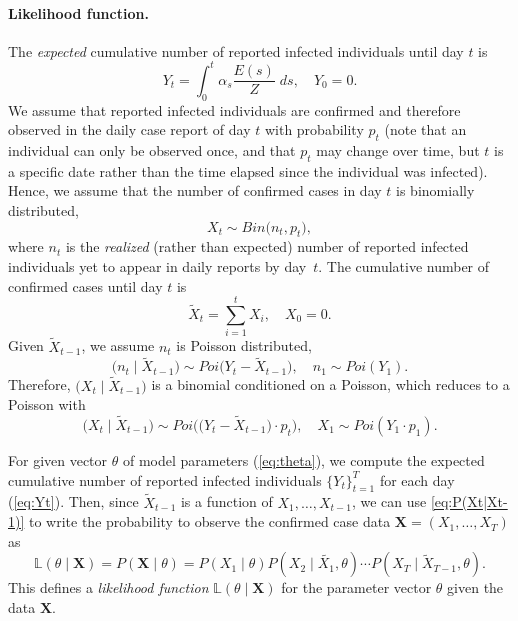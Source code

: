 \documentclass[12pt]{extarticle}
\let\vec\mathbf
\begin{document}
\paragraph*{Likelihood function.}
The \emph{expected} cumulative number of reported infected individuals until day $t$ is 
\begin{equation} \label{eq:Yt}
Y_t=\int_{0}^{t}{\alpha_s \frac{E(s)}{Z} \; ds}, \quad Y_0 = 0.
\end{equation}
We assume that reported infected individuals are confirmed and therefore observed in the daily case report of day $t$ with probability $p_t$ (note that an individual can only be observed once, and that $p_t$ may change over time, but $t$ is a specific date rather than the time elapsed since the individual was infected).
Hence, we assume that the number of confirmed cases in day $t$ is binomially distributed,
$$
X_t \sim \mathit{Bin}\big(n_t, p_t\big),
$$
where $n_t$ is the \emph{realized} (rather than expected) number of reported infected individuals yet to appear in daily reports by day~$t$.
The cumulative number of confirmed cases until day $t$ is
$$
\tilde{X}_t=\sum_{i=1}^{t}X_i, \quad X_0=0.
$$
Given $\tilde{X}_{t-1}$, we assume $n_t$ is Poisson distributed,
$$
\big(n_t \mid \tilde{X}_{t-1}\big) \sim \mathit{Poi}\Big( Y_t - \tilde{X}_{t-1} \Big), 
\quad n_1 \sim \mathit{Poi}(Y_1).
$$ 
Therefore, $\big(X_t \mid \tilde{X}_{t-1} \big)$ is a binomial conditioned on a Poisson, which reduces to a Poisson with
\begin{equation} \label{eq:P(Xt|Xt-1)}
\big(X_t \mid \tilde{X}_{t-1} \big) \sim \mathit{Poi}\Big( \big( Y_t - \tilde{X}_{t-1} \big) \cdot p_t \Big), 
\quad X_1 \sim \mathit{Poi}(Y_1 \cdot p_1).
\end{equation}

For given vector $\theta$ of model parameters (\autoref{eq:theta}), we compute the expected cumulative number of reported infected individuals $\{Y_t\}_{t=1}^{T}$ for each day (\autoref{eq:Yt}). Then, since $\tilde{X}_{t-1}$ is a function of $X_1, \ldots, X_{t-1}$, we can use \autoref{eq:P(Xt|Xt-1)} to write the probability to observe the confirmed case data $\vec{X} = (X_1, \ldots, X_T)$ as 
\begin{equation} \label{eq:likelihood}
\mathbb{L}(\theta \mid \vec{X}) = P(\vec{X} \mid \theta) = P(X_1 \mid \theta) P(X_2 \mid \tilde{X_1}, \theta) \cdots P(X_T \mid \tilde{X}_{T-1}, \theta).
\end{equation}
This defines a \emph{likelihood function} $\mathbb{L}(\theta \mid \vec{X})$ for the parameter vector $\theta$ given the data $\vec{X}$.
\end{document}
